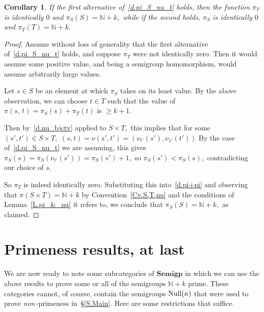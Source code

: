 \documentclass{amsart}
\newtheorem{corollary}[theorem]{Corollary}
\numberwithin{equation}{section}
\numberwithin{theorem}{section}
\newcommand{\N}{\mathbb{N}}
\begin{document}
\begin{corollary}\label{C.split_pi}
If the first alternative of~\eqref{d.pi_S_nu_t} holds, then
the function $\pi_T$ is identically $0$ and $\pi_S(S)=\N\!+\!k,$
while if the second holds, $\pi_S$ is identically $0$ and
$\pi_T(T)=\N\!+\!k.$
\end{corollary}

\begin{proof}
Assume without loss of generality that
the first alternative of~\eqref{d.pi_S_nu_t} holds,
and suppose $\pi_T$ were not identically zero.
Then it would assume some positive value, and being a semigroup
homomorphism, would assume arbitrarily large values.

Let $s\in S$ be an element at which $\pi_S$ takes on its least value.
By the above observation, we can choose $t\in T$ such that the
value of $\pi(s,\,t)=\pi_S(s)+\pi_T(t)$ is $\geq k\!+\!1.$

Then by~\eqref{d.nu_bjctv} applied to $S\times T,$
this implies that for some $(s',t')\in S\times T,$
$(s,t)=\nu(s',t')=(\nu_{t'}(s'),\nu_{s'}(t'))$
By the case of~\eqref{d.pi_S_nu_t} we are assuming,
this gives $\pi_S(s)=\pi_S(\nu_{t'}(s'))=\pi_S(s')+1,$
so $\pi_S(s')<\pi_S(s),$ contradicting our choice of $s.$

So $\pi_T$ is indeed identically zero.
Substituting this into~\eqref{d.pi+pi} and observing
that $\pi(S\times T)=\N\!+\!k$
by Convention~\ref{Cv.S,T,nu} and the conditions of
Lemma~\ref{L.pi_&_nu} it refers to,
we conclude that $\pi_S(S)=\N\!+\!k,$ as claimed.
\end{proof}

\section{Primeness results, at last}\label{S.N_etc}

We are now ready to note some
subcategories of $\mathbf{Semigp}$ in which we can use the
above results to prove some or all of the semigroups $\N\!+\!k$ prime.
These categories cannot, of course, contain the semigroups
$\textup{Null}(\kappa)$ that were used to prove
{\em non\,}-primeness in~\S\ref{S.Main}.
Here are some restrictions that suffice.
\end{document}
